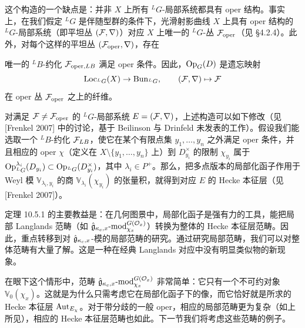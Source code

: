 这个构造的一个缺点是：并非 $X$ 上所有 ${}^L G$-局部系统都具有 oper 结构。事实上，在我们假定 ${}^L G$ 是伴随型群的条件下，光滑射影曲线 $X$ 上具有 oper 结构的 ${}^L G$-局部系统（即平坦丛 $(\mathcal{F},\nabla)$）对应 $X$ 上唯一的 ${}^L G$-丛 $\mathcal{F}_{\mathrm{oper}}$（见 §4.2.4）。此外，对每个这样的平坦丛 $(\mathcal{F}_{\mathrm{oper}},\nabla)$，存在

唯一的 ${}^L B$-约化 $\mathcal{F}_{\mathrm{oper},LB}$ 满足 oper 条件。因此，$\operatorname{Op}_G(D)$ 是遗忘映射
\[
    \operatorname{Loc}_{{}^L G}(X)\to\operatorname{Bun}_{{}^L G},
    \qquad (\mathcal{F},\nabla)\mapsto \mathcal{F}
\]
在 oper 丛 $\mathcal{F}_{\mathrm{oper}}$ 之上的纤维。


对满足 $\mathcal{F}\neq\mathcal{F}_{\mathrm{oper}}$ 的 ${}^L G$-局部系统 $E=(\mathcal{F},\nabla)$，上述构造可以如下修改（见 [Frenkel 2007] 中的讨论，基于 Beilinson 与 Drinfeld 未发表的工作）。假设我们能选取一个 ${}^L B$-约化 $\mathcal{F}_{LB}$，使它在某个有限点集 $y_1,\dots,y_n$ 之外满足 oper 条件，并且相应的 oper $\chi$（定义在 $X\setminus\{y_1,\dots,y_n\}$ 上）到 $D^\times_{y_i}$ 的限制 $\chi_{y_i}$ 属于 $\operatorname{Op}^{\lambda_i}_{{}^L G}(D_{y_i})\subset\operatorname{Op}_{{}^L G}(D^\times_{y_i})$，其中 $\lambda_i\in P^+$。那么，把多点版本的局部化函子作用于 Weyl 模 $\mathbb{V}_{\lambda_i,y_i}$ 的商 $\mathbb{V}_{\lambda_i}(\chi_{y_i})$ 的张量积，就得到对应 $E$ 的 Hecke 本征层（见 [Frenkel 2007]）。

定理 10.5.1 的主要教益是：在几何图景中，局部化函子是强有力的工具，能把局部 Langlands 范畴（如 $\hat{\mathfrak{g}}_{\kappa_c,x}\text{-mod}^{G(\mathcal{O}_x)}_{\chi_x}$）转换为整体的 Hecke 本征层范畴。因此，重点转移到对 $\hat{\mathfrak{g}}_{\kappa_c,x}$-模的局部范畴的研究。通过研究局部范畴，我们可以对整体范畴有大量了解。这是一种在经典 Langlands 对应中没有明显类似物的新现象。

在眼下这个情形中，范畴 $\hat{\mathfrak{g}}_{\kappa_c,x}\text{-mod}^{G(\mathcal{O}_x)}_{\chi_x}$ 非常简单：它只有一个不可约对象 $\mathbb{V}_0(\chi_x)$。这就是为什么只需考虑它在局部化函子下的像，而它恰好就是所求的 Hecke 本征层 $\operatorname{Aut}_{E_\chi}$。对于带分歧的一般 oper，相应的局部范畴更为复杂（如上所见），相应的 Hecke 本征层范畴也如此。下一节我们将考虑这些范畴的例子。

